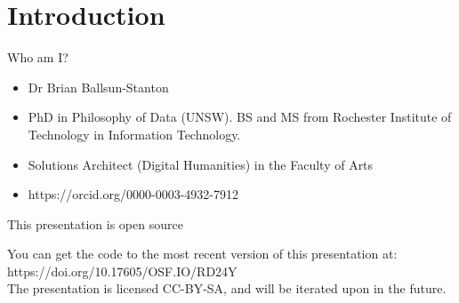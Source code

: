 \documentclass[aspectratio=169]{beamer}
\newcommand{\clearbackground}[0]{\setbeamertemplate{background}{}}
\newcommand{\purplerect}[1]{\begin{tikzpicture}
\node[draw,bingpurple,fill=bingpurple, shape=rectangle, rounded corners=12pt, align=right, text width=3.5cm, inner sep=2mm, blur shadow={shadow blur steps=5}]{\textcolor{white}{#1}}; \end{tikzpicture}}
\begin{document}


\clearbackground{}






\section{Introduction}

\begin{frame}{Who am I?}

\begin{itemize}
    \item Dr Brian Ballsun-Stanton
    \item PhD in Philosophy of Data (UNSW). BS and MS from Rochester Institute of Technology in Information Technology.
    \item Solutions Architect (Digital Humanities) in the Faculty of Arts
    \item https://orcid.org/0000-0003-4932-7912 
\end{itemize}

\end{frame}

\begin{frame}{This presentation is open source}

You can get the code to the most recent version of this presentation at: https://doi.org/10.17605/OSF.IO/RD24Y\\[1em]
The presentation is licensed CC-BY-SA, and will be iterated upon in the future.


\end{frame}
\end{document}

